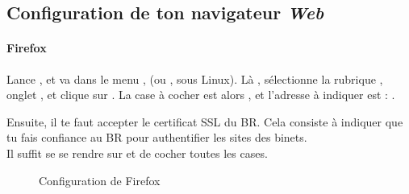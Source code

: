
\subsection{Configuration de ton navigateur \emph{Web}}
\label{browser}

\paragraph{Firefox}

Lance , et va dans le menu ,
 (ou ,  sous Linux). L\`a , s\'electionne la rubrique , onglet , et clique sur
. La case \`a  cocher est alors ,
et l'adresse \`a  indiquer est : .

Ensuite, il te faut accepter le certificat SSL du BR. Cela consiste \`a indiquer que tu fais confiance au BR pour authentifier les sites des binets.\\
Il suffit se se rendre sur  et de cocher toutes les cases.\\

\noindent
  \begin{figure}[!h]
    \begin{center}  
           \caption{Configuration de Firefox}
    \end{center}
  \end{figure}
%

